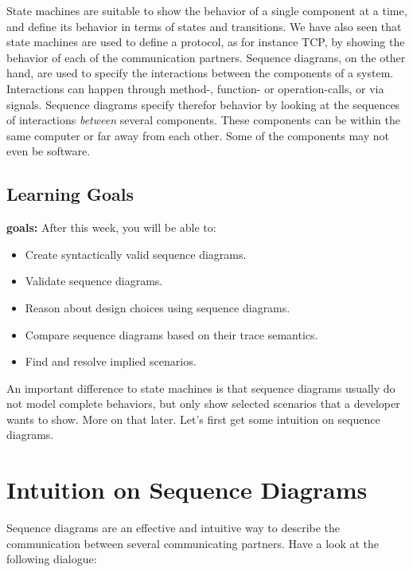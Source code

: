 \documentclass[10pt, twoside, twocolumn]{book}
\providecommand{\tightlist}{%
  \setlength{\itemsep}{0pt}\setlength{\parskip}{0pt}}
\begin{document}
State machines are suitable to show the behavior of a single component
at a time, and define its behavior in terms of states and transitions.
We have also seen that state machines are used to define a protocol, as
for instance TCP, by showing the behavior of each of the communication
partners. Sequence diagrams, on the other hand, are used to specify the
interactions between the components of a system. Interactions can happen
through method-, function- or operation-calls, or via signals. Sequence
diagrams specify therefor behavior by looking at the sequences of
interactions \emph{between} several components. These components can be
within the same computer or far away from each other. Some of the
components may not even be software.

\hypertarget{learning-goals}{%
\subsection{Learning Goals}\label{learning-goals}}

\textbf{goals:} After this week, you will be able to:

\begin{itemize}
\tightlist
\item
  Create syntactically valid sequence diagrams.
\item
  Validate sequence diagrams.
\item
  Reason about design choices using sequence diagrams.
\item
  Compare sequence diagrams based on their trace semantics.
\item
  Find and resolve implied scenarios.
\end{itemize}

An important difference to state machines is that sequence diagrams
usually do not model complete behaviors, but only show selected
scenarios that a developer wants to show. More on that later. Let's
first get some intuition on sequence diagrams.

\hypertarget{intuition-on-sequence-diagrams}{%
\section{Intuition on Sequence
Diagrams}\label{intuition-on-sequence-diagrams}}

Sequence diagrams are an effective and intuitive way to describe the
communication between several communicating partners. Have a look at the
following dialogue:
\end{document}
